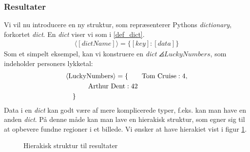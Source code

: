 {\subsubsection{Resultater}
Vi vil nu introducere en ny struktur, som repræsenterer Pythons
\emph{dictionary}, forkortet \emph{dict}.
En \emph{dict} viser vi som i \ref{def_dict}.
\begin{eqnarray}
    \langle[\textit{dictName}]\rangle = \{ [\textit{key}] : [\textit{data}] \}
    \label{def_dict}
\end{eqnarray}
Som et simpelt eksempel, kan vi konstruere en \emph{dict}
$\angles{LuckyNumbers}$, som indeholder personers lykketal:
\begin{multline}
    \angles{LuckyNumbers} = \{ \qquad \textrm{Tom Cruise} : 4 , \\
    \textrm{Arthur Dent} : 42 \qquad\qquad\\
    \shoveleft{\}}\shoveright{}
    \label{lucky_dict}
\end{multline}
Data i en \emph{dict} kan godt være af mere komplicerede typer, f.eks.
kan man have en anden \emph{dict}. På denne måde kan man lave en
hierakisk struktur, som egner sig til at opbevere fundne regioner i et
billede. Vi ønsker at have hierakiet vist i figur
\ref{resultat_hieraki}.

\begin{figure}[!h]
    \caption[]{Hierakisk struktur til resultater}
    \label{resultat_hieraki}
\end{figure}

}
